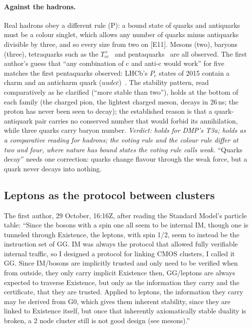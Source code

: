 \documentclass[11pt,a4paper]{article}
\theoremstyle{definition}
\theoremstyle{remark}
\newcommand{\chk}[1]{\textsf{[#1]}}
\newcommand{\tagP}{\textsf{(P)}}
\begin{document}
\paragraph{Against the hadrons.} Real hadrons obey a different rule \tagP: a bound state of quarks and antiquarks must be a colour
singlet, which allows any number of quarks minus antiquarks divisible by three, and so every size from two on \chk{E11}. Mesons (two),
baryons (three), tetraquarks such as the $T_{cc}^+$~\cite{tcc} and pentaquarks~\cite{lhcbpc} are all observed. The first author's guess
that ``any combination of c and anti-c would work'' for five matches the first pentaquarks observed: LHCb's $P_c$ states of 2015 contain a
charm and an anticharm quark ($uudc\bar c$)~\cite{lhcbpc}. The stability pattern, read comparatively as he clarified (``more stable than
two''), holds at the bottom of each family (the charged pion, the lightest charged meson, decays in 26\,ns; the proton has never been seen to decay); the
established reason is that a quark-antiquark pair carries no conserved number that would forbid its annihilation, while three quarks carry
baryon number. \emph{Verdict: holds for DMP's T3a; holds as a comparative reading for hadrons; the voting rule and the colour rule differ
at two and four, where nature has bound states the voting rule calls weak.} ``Quarks decay'' needs one correction: quarks change flavour
through the weak force, but a quark never decays into nothing.

\subsection{Leptons as the protocol between clusters}

The first author, 29 October, 16:16Z, after reading the Standard Model's particle table: ``Since the bosons with a spin one all seem to be
internal IM, though one is tunneled through Existence, the leptons, with spin 1/2, seem to instead be the instruction set of GG. IM was always
the protocol that allowed fully verifiable internal traffic, so I designed a protocol for linking CMOS clusters, I called it GG. Since
IM/bosons are implicitly trusted and only need to be verified when from outside, they only carry implicit Existence then, GG/leptons are
always expected to traverse Existence, but only as the information they carry and the certificate, that they are trusted. Applied to
leptons, the information they carry may be derived from G0, which gives them inherent stability, since they are linked to Existence itself,
but once that inherently axiomatically stable duality is broken, a 2 node cluster still is not good design (see mesons).''
\end{document}
